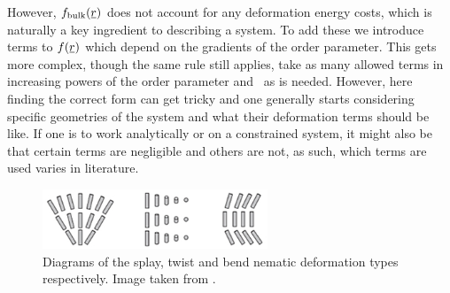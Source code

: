 \documentclass[12pt]{article}
\newcommand{\suf}[2]{\stackunder[1pt]{\ensuremath{#1}}{\rule{\widthof{\ensuremath{#2}}*\real{0.9}}{.1ex}}}
\newcommand{\su}[1]{\suf{#1}{#1}}
\newcommand{\mgrad}{\suf{\nabla}{K}}
\begin{document}
However, $f_\text{bulk}(\su{r})$ does not account for any deformation energy costs, which is naturally a key ingredient to describing a system.
To add these we introduce terms to $f(\su{r})$ which depend on the gradients of the order parameter.
This gets more complex, though the same rule still applies, take as many allowed terms in increasing powers of the order parameter and \mgrad\ as is needed.
However, here finding the correct form can get tricky and one generally starts considering specific geometries of the system and what their deformation terms should be like.
If one is to work analytically or on a constrained system, it might also be that certain terms are negligible and others are not, as such, which terms are used varies in literature.

\begin{figure}[t]
    \begin{center}
        \includegraphics[width=0.6\textwidth]{figures/nematic_deformations.jpg}
    \end{center}
    \caption{
        Diagrams of the splay, twist and bend nematic deformation types respectively.
        Image taken from \cite{suryantariImageFeatureExtraction2019}.
    }\label{fig:nem_deform}
\end{figure}
\end{document}
